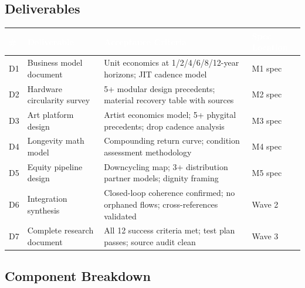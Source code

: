 \documentclass[11pt,letterpaper]{article}
\newcommand{\tableheader}[1]{\textbf{\sffamily\textcolor{white}{#1}}}
\begin{document}
\subsection{Deliverables}

\begin{center}
\begin{tabularx}{\textwidth}{C{0.8cm}L{3.5cm}XL{3cm}}
\toprule
{}
\tableheader{\#} & \tableheader{Deliverable} & \tableheader{Acceptance Criteria} & \tableheader{Spec Location} \\
\midrule
D1 & Business model document & Unit economics at 1/2/4/6/8/12-year horizons; JIT cadence model & M1 spec \\
D2 & Hardware circularity survey & 5+ modular design precedents; material recovery table with sources & M2 spec \\
D3 & Art platform design & Artist economics model; 5+ phygital precedents; drop cadence analysis & M3 spec \\
D4 & Longevity math model & Compounding return curve; condition assessment methodology & M4 spec \\
D5 & Equity pipeline design & Downcycling map; 3+ distribution partner models; dignity framing & M5 spec \\
D6 & Integration synthesis & Closed-loop coherence confirmed; no orphaned flows; cross-references validated & Wave 2 \\
D7 & Complete research document & All 12 success criteria met; test plan passes; source audit clean & Wave 3 \\
\bottomrule
\end{tabularx}
\end{center}

\subsection{Component Breakdown}
\end{document}
